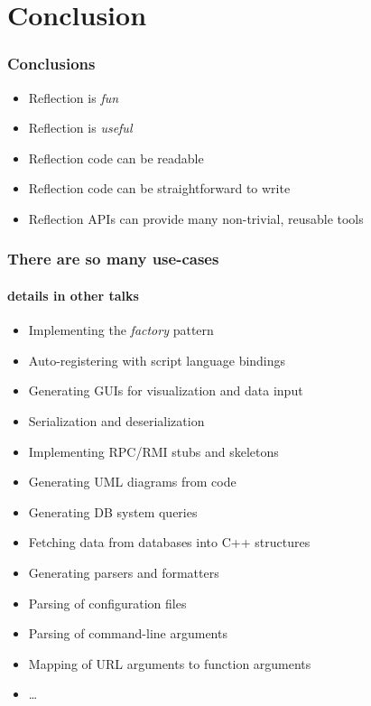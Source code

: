 \documentclass[compress,table,xcolor=table]{beamer}
\begin{document}
\section{Conclusion}
\begin{frame}
  \frametitle{Conclusions}
  \larger
  \begin{itemize}
    \item Reflection is {\em \larger fun}
    \item Reflection is {\em \larger useful}
    \item Reflection code can be readable
    \item Reflection code can be straightforward to write
    \item Reflection APIs can provide many non-trivial, reusable tools
  \end{itemize}
\end{frame}
\begin{frame}
  \frametitle{There are so many use-cases}
  \framesubtitle{details in other talks}
  \begin{itemize}
    \item Implementing the {\em factory} pattern
    \item Auto-registering with script language bindings
    \item Generating GUIs for visualization and data input
    \item Serialization and deserialization
    \item Implementing RPC/RMI stubs and skeletons
    \item Generating UML diagrams from code
    \item Generating DB system queries
    \item Fetching data from databases into C++ structures
    \item Generating  parsers and formatters
    \item Parsing of configuration files
    \item Parsing of command-line arguments
    \item Mapping of URL arguments to function arguments
    \item \ldots
  \end{itemize}
\end{frame}
\end{document}

